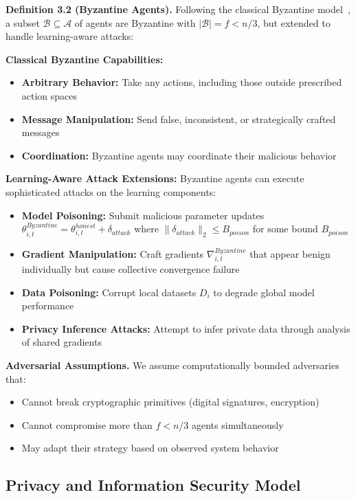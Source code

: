 \documentclass[conference]{IEEEtran}
\begin{document}
\textbf{Definition 3.2 (Byzantine Agents).} Following the classical Byzantine model~\cite{lamport1982byzantine}, a subset $\mathcal{B} \subseteq \mathcal{A}$ of agents are Byzantine with $|\mathcal{B}| = f < n/3$, but extended to handle learning-aware attacks:

\textbf{Classical Byzantine Capabilities:}
\begin{itemize}
    \item \textbf{Arbitrary Behavior:} Take any actions, including those outside prescribed action spaces
    \item \textbf{Message Manipulation:} Send false, inconsistent, or strategically crafted messages
    \item \textbf{Coordination:} Byzantine agents may coordinate their malicious behavior
\end{itemize}

\textbf{Learning-Aware Attack Extensions:} Byzantine agents can execute sophisticated attacks on the learning components:
\begin{itemize}
    \item \textbf{Model Poisoning:} Submit malicious parameter updates $\theta_{i,t}^{Byzantine} = \theta_{i,t}^{honest} + \delta_{attack}$ where $\|\delta_{attack}\|_2 \leq B_{poison}$ for some bound $B_{poison}$
    \item \textbf{Gradient Manipulation:} Craft gradients $\nabla_{i,t}^{Byzantine}$ that appear benign individually but cause collective convergence failure
    \item \textbf{Data Poisoning:} Corrupt local datasets $D_i$ to degrade global model performance
    \item \textbf{Privacy Inference Attacks:} Attempt to infer private data through analysis of shared gradients~\cite{abadi2016deep}
\end{itemize}

\textbf{Adversarial Assumptions.} We assume computationally bounded adversaries that:
\begin{itemize}
    \item Cannot break cryptographic primitives (digital signatures, encryption)
    \item Cannot compromise more than $f < n/3$ agents simultaneously
    \item May adapt their strategy based on observed system behavior
\end{itemize}

\subsection{Privacy and Information Security Model}
\end{document}
